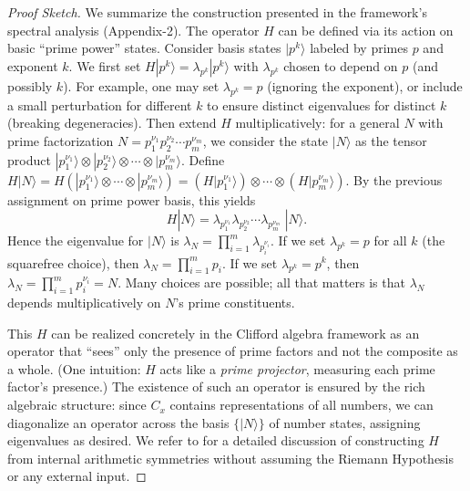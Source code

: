 \documentclass[11pt]{article}
\begin{document}
{\begin{proof}[Proof Sketch]
We summarize the construction presented in the framework’s spectral analysis (Appendix-2). The operator $H$ can be defined via its action on basic “prime power” states. Consider basis states $|p^k\rangle$ labeled by primes $p$ and exponent $k$. We first set $H|p^k\rangle = \lambda_{p^k} |p^k\rangle$ with $\lambda_{p^k}$ chosen to depend on $p$ (and possibly $k$). For example, one may set $\lambda_{p^k} = p$ (ignoring the exponent), or include a small perturbation for different $k$ to ensure distinct eigenvalues for distinct $k$ (breaking degeneracies). Then extend $H$ multiplicatively: for a general $N$ with prime factorization $N = p_1^{\nu_1} p_2^{\nu_2}\cdots p_m^{\nu_m}$, we consider the state $|N\rangle$ as the tensor product $|p_1^{\nu_1}\rangle \otimes |p_2^{\nu_2}\rangle \otimes \cdots \otimes |p_m^{\nu_m}\rangle$. Define $H|N\rangle = H(|p_1^{\nu_1}\rangle \otimes \cdots \otimes |p_m^{\nu_m}\rangle) = (H|p_1^{\nu_1}\rangle)\otimes \cdots \otimes (H|p_m^{\nu_m}\rangle)$. By the previous assignment on prime power basis, this yields 
\[ H|N\rangle = \lambda_{p_1^{\nu_1}}\lambda_{p_2^{\nu_2}}\cdots \lambda_{p_m^{\nu_m}} \; |N\rangle. \] 
Hence the eigenvalue for $|N\rangle$ is $\lambda_N = \prod_{i=1}^m \lambda_{p_i^{\nu_i}}$. If we set $\lambda_{p^k} = p$ for all $k$ (the squarefree choice), then $\lambda_N = \prod_{i=1}^m p_i$. If we set $\lambda_{p^k} = p^k$, then $\lambda_N = \prod_{i=1}^m p_i^{\nu_i} = N$. Many choices are possible; all that matters is that $\lambda_N$ depends multiplicatively on $N$’s prime constituents.

This $H$ can be realized concretely in the Clifford algebra framework as an operator that “sees” only the presence of prime factors and not the composite as a whole. (One intuition: $H$ acts like a \emph{prime projector}, measuring each prime factor’s presence.) The existence of such an operator is ensured by the rich algebraic structure: since $C_x$ contains representations of all numbers, we can diagonalize an operator across the basis $\{|N\rangle\}$ of number states, assigning eigenvalues as desired. We refer to  for a detailed discussion of constructing $H$ from internal arithmetic symmetries without assuming the Riemann Hypothesis or any external input.
\end{proof}

}
\end{document}

